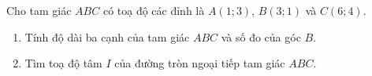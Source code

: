 \begin{bt}%
	Cho tam giác $ABC$ có toạ độ các đỉnh là $A(1;3)$, $B(3;1)$ và $C(6;4)$.
	\begin{enumerate}
		\item Tính độ dài ba cạnh của tam giác $ABC$ và số đo của góc $B$.
		\item Tìm toạ độ tâm $I$ của đường tròn ngoại tiếp tam giác $ABC$.
	\end{enumerate}
\end{bt}

